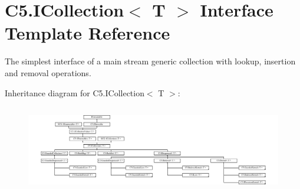 \hypertarget{interface_c5_1_1_i_collection}{}\section{C5.\+I\+Collection$<$ T $>$ Interface Template Reference}
\label{interface_c5_1_1_i_collection}


The simplest interface of a main stream generic collection with lookup, insertion and removal operations.  


Inheritance diagram for C5.\+I\+Collection$<$ T $>$\+:\begin{figure}[H]
\begin{center}
\leavevmode
\includegraphics[height=3.825137cm]{interface_c5_1_1_i_collection}
\end{center}
\end{figure}
